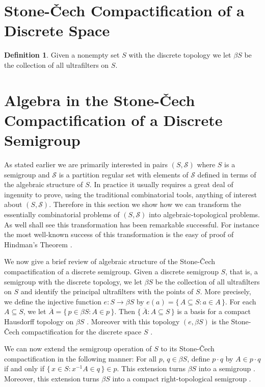 \documentclass[12pt]{article}
\theoremstyle{plain}
\theoremstyle{definition}
\newtheorem{defn}[thm]{Definition}
\newcommand{\calS}{\mathcal{S}}
\begin{document}
\section{Stone-\v{C}ech Compactification of a Discrete Space}

\begin{defn}
  Given a nonempty set $S$ with the discrete topology we let $\beta S$ be the collection of all ultrafilters on $S$. 
\end{defn}

\section{Algebra in the Stone-\v{C}ech Compactification of a Discrete Semigroup}

As stated earlier we are primarily interested in pairs $(S, \calS)$ where $S$ is a semigroup and $\calS$ is a partition regular set with elements of $\calS$ defined in terms of the algebraic structure of $S$.
In practice it usually requires a great deal of ingenuity to prove, using the traditional combinatorial tools, anything of interest about $(S, \calS)$. 
Therefore in this section we show how we can transform the essentially combinatorial problems of $(S, \calS)$ into algebraic-topological problems. 
As well shall see this transformation has been remarkable successful.
For instance the most well-known success of this transformation is the easy of proof of Hindman's Theorem \cite[Corollary 5.9]{Hindman:1998fk}.

We now give a brief review of algebraic structure of the Stone-\v{C}ech compactification of a discrete semigroup.  
Given a discrete semigroup $S$, that is, a semigroup with the discrete topology, we let $\beta S$ be the collection of all ultrafilters on $S$ and identify the principal ultrafilters with the points of $S$.
More precisely, we define the injective function $e \colon S \to \beta S$ by $e(a) = \{\, A \subseteq S : a \in A \,\}$.
For each $A \subseteq S$, we let $\overline{A} = \{\, p \in \beta S : A \in p \,\}$.
Then $\{\, \overline{A} : A \subseteq S \,\}$ is a basis for a compact Hausdorff topology on $\beta S$ \cite[Theorem 3.18(a)]{Hindman:1998fk}. 
Moreover with this topology $(e, \beta S)$ is the Stone-\v{C}ech compactification for the discrete space $S$ \cite[Theorem 3.27]{Hindman:1998fk}. 

We can now extend the semigroup operation of $S$ to its Stone-\v{C}ech compactification in the following manner:  For all $p$, $q \in \beta S$, define $p \cdot q$ by $A \in p \cdot q$ if and only if $\{\, x \in S : x^{-1}A \in q \,\} \in p$. 
This extension turns $\beta S$ into a semigroup \cite[Theorem 4.1, Theorem 4.4, and Theorem 4.12]{Hindman:1998fk}. 
Moreover, this extension turns $\beta S$ into a compact right-topological semigroup \cite[Theorem 4.1(b)]{Hindman:1998fk}.
\end{document}

